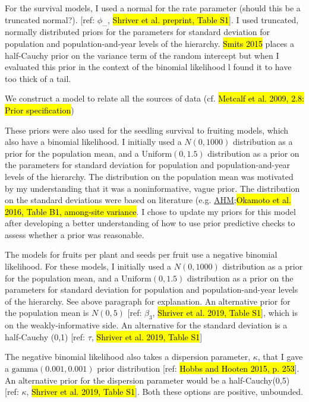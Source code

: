 \documentclass[12pt, oneside, titlepage]{article}   	%
\begin{document}
For the survival models, I used a normal for the rate parameter (should this be a truncated normal?). [ref: $\phi_{\dots}$, \hl{Shriver et al. preprint, Table S1}]. I used truncated, normally distributed priors for the parameters for standard deviation for population and population-and-year levels of the hierarchy. \hl{Smits 2015} places a half-Cauchy prior on the variance term of the random intercept but when I evaluated this prior in the context of the binomial likelihood l found it to have too thick of a tail.

We construct a model to relate all the sources of data (cf. \hl{Metcalf et al. 2009, 2.8: Prior specification})

These priors were also used for the seedling survival to fruiting models, which also have a binomial likelihood. I initially used a $N(0,1000)$ distribution as a prior for the population mean, and a $\mathrm{Uniform}(0,1.5)$ distribution as a prior on the parameters for standard deviation for population and population-and-year levels of the hierarchy. The distribution on the population mean was motivated by my understanding that it was a noninformative, vague prior. The distribution on the standard deviations were based on literature (e.g.  \href{www.mbr-pwrc.usgs.gov/pubanalysis/keryroylebook/R_BUGS_code_AHM_Vol_1_20170519.R}{AHM};\hl{Okamoto et al. 2016, Table B1, among-site variance}. I chose to update my priors for this model after developing a better understanding of how to use prior predictive checks to assess whether a prior was reasonable.

The models for fruits per plant and seeds per fruit use a negative binomial likelihood. For these models, I initially used a $N(0,1000)$ distribution as a prior for the population mean, and a $\mathrm{Uniform}(0,1.5)$ distribution as a prior on the parameters for standard deviation for population and population-and-year levels of the hierarchy. See above paragraph for explanation. An alternative prior for the population mean is $N(0,5)$ [ref: $\beta_3$, \hl{Shriver et al. 2019, Table S1}], which is on the weakly-informative side. An alternative for the standard deviation is a half-Cauchy (0,1) [ref: $\tau$, \hl{Shriver et al. 2019, Table S1}]

 The negative binomial likelihood also takes a dispersion parameter, $\kappa$, that I gave a $\mathrm{gamma}(0.001,0.001)$ prior distribution [ref: \hl{Hobbs and Hooten 2015, p. 253}]. An alternative prior for the dispersion parameter would be a half-Cauchy(0,5) [ref: $\kappa$, \hl{Shriver et al. 2019, Table S1}]. Both these options are positive, unbounded. 
\end{document}
